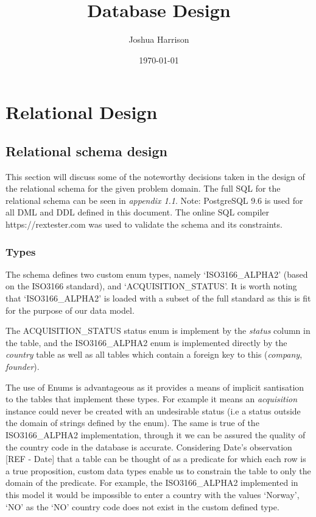 \documentclass[12pt]{article}
\title{Database Design}
\author{Joshua Harrison}
\date{\today}
\begin{document}
\maketitle

\section{Relational Design}

\subsection{Relational schema design}
This section will discuss some of the noteworthy decisions taken in the design of the relational schema for the given problem domain.
The full SQL for the relational schema can be seen in \emph{appendix 1.1}. Note: PostgreSQL 9.6 is used for all DML and DDL defined in this document. The online SQL compiler https://rextester.com was used to validate the schema and its constraints.

\subsubsection{Types}
The schema defines two custom enum types, namely  `ISO3166\_ALPHA2' (based on the ISO3166 standard), and `ACQUISITION\_STATUS'. It is worth noting that `ISO3166\_ALPHA2' is loaded with a subset of the full standard as this is fit for the purpose of our data model.

The ACQUISITION\_STATUS status enum is implement by the \emph{status} column in the  table, and the ISO3166\_ALPHA2 enum is implemented directly by the \emph{country} table as well as all tables which contain a foreign key to this (\emph{company}, \emph{founder}).

The use of Enums is advantageous as it provides a means of implicit santisation to the tables that implement these types. For example it means an \emph{acquisition} instance could never be created with an undesirable status (i.e a status outside the domain of strings defined by the enum). The same is true of the ISO3166\_ALPHA2 implementation, through it we can be assured the quality of the country code in the database is accurate. Considering Date's  observation [REF - Date] that a table can be thought of as a predicate for which each row is a true proposition, custom data types enable us to constrain the table to only the domain of the predicate. For example, the ISO3166\_ALPHA2 implemented in this model it would be impossible to enter a country with the values `Norway', `NO' as the `NO' country code does not exist in the custom defined type.
\end{document}
